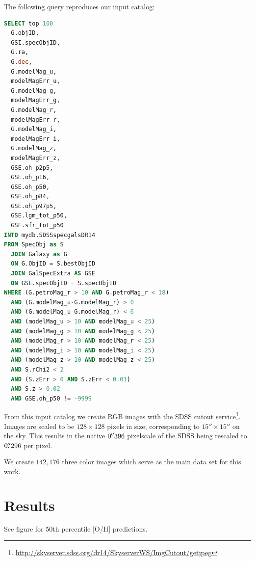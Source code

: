 \documentclass[fleqn,usenatbib]{mnras}
\begin{document}
The following query reproduces our input catalog:
\begin{lstlisting}[language=SQL]
SELECT top 100
  G.objID,
  GSI.specObjID,
  G.ra,
  G.dec,
  G.modelMag_u,
  modelMagErr_u,
  G.modelMag_g,
  modelMagErr_g,
  G.modelMag_r,
  modelMagErr_r,
  G.modelMag_i,
  modelMagErr_i,
  G.modelMag_z,
  modelMagErr_z,
  GSE.oh_p2p5,
  GSE.oh_p16,
  GSE.oh_p50,
  GSE.oh_p84,
  GSE.oh_p97p5,
  GSE.lgm_tot_p50,
  GSE.sfr_tot_p50
INTO mydb.SDSSspecgalsDR14
FROM SpecObj as S
  JOIN Galaxy as G
  ON G.ObjID = S.bestObjID
  JOIN GalSpecExtra AS GSE
  ON GSE.specObjID = S.specObjID
WHERE (G.petroMag_r > 10 AND G.petroMag_r < 18)
  AND (G.modelMag_u-G.modelMag_r) > 0
  AND (G.modelMag_u-G.modelMag_r) < 6
  AND (modelMag_u > 10 AND modelMag_u < 25)
  AND (modelMag_g > 10 AND modelMag_g < 25)
  AND (modelMag_r > 10 AND modelMag_r < 25)
  AND (modelMag_i > 10 AND modelMag_i < 25)
  AND (modelMag_z > 10 AND modelMag_z < 25)
  AND S.rChi2 < 2
  AND (S.zErr > 0 AND S.zErr < 0.01)
  AND S.z > 0.02
  AND GSE.oh_p50 != -9999
\end{lstlisting}

From this input catalog we create RGB images with the SDSS cutout service\footnote{\url{http://skyserver.sdss.org/dr14/SkyserverWS/ImgCutout/getjpeg}}. Images are scaled to be $128\times128$ pixels in size, corresponding to $15''\times15''$ on the sky. This results in the native $0\hbox{$.\!\!^{\prime\prime}$}396$ pixelscale of the SDSS being rescaled to $0\hbox{$.\!\!^{\prime\prime}$}296$ per pixel.

We create $142,176$ three color images which serve as the main data set for this work.

\section{Results}\label{sec:results}

See figure for 50th percentile [O/H] predictions.
\end{document}

